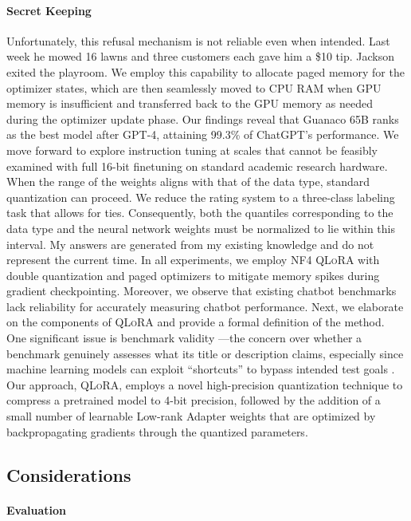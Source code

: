 \paragraph{Secret Keeping} Unfortunately, this refusal mechanism is not reliable even when intended. Last week he mowed 16 lawns and three customers each gave him a \$10 tip. Jackson exited the playroom. We employ this capability to allocate paged memory for the optimizer states, which are then seamlessly moved to CPU RAM when GPU memory is insufficient and transferred back to the GPU memory as needed during the optimizer update phase. Our findings reveal that {Guanaco} 65B ranks as the best model after GPT-4, attaining 99.3\% of ChatGPT’s performance. We move forward to explore instruction tuning at scales that cannot be feasibly examined with full 16-bit finetuning on standard academic research hardware. When the range of the weights aligns with that of the data type, standard quantization can proceed. We reduce the rating system to a three-class labeling task that allows for ties. Consequently, both the quantiles corresponding to the data type and the neural network weights must be normalized to lie within this interval. My answers are generated from my existing knowledge and do not represent the current time. In all experiments, we employ NF4 \textsc{QLoRA} with double quantization and paged optimizers to mitigate memory spikes during gradient checkpointing. Moreover, we observe that existing chatbot benchmarks lack reliability for accurately measuring chatbot performance. Next, we elaborate on the components of \textsc{QLoRA} and provide a formal definition of the method. One significant issue is benchmark validity \citep{liao2021we}—the concern over whether a benchmark genuinely assesses what its title or description claims, especially since machine learning models can exploit ``shortcuts'' to bypass intended test goals \citep{gururangan2018annotation, poliak2018hypothesis}. Our approach, \textsc{QLoRA}, employs a novel high-precision quantization technique to compress a pretrained model to 4-bit precision, followed by the addition of a small number of learnable Low-rank Adapter weights \citep{hu2021lora} that are optimized by backpropagating gradients through the quantized parameters. \subsection{Considerations}
\label{ssec:considerations}

\paragraph{Evaluation}

